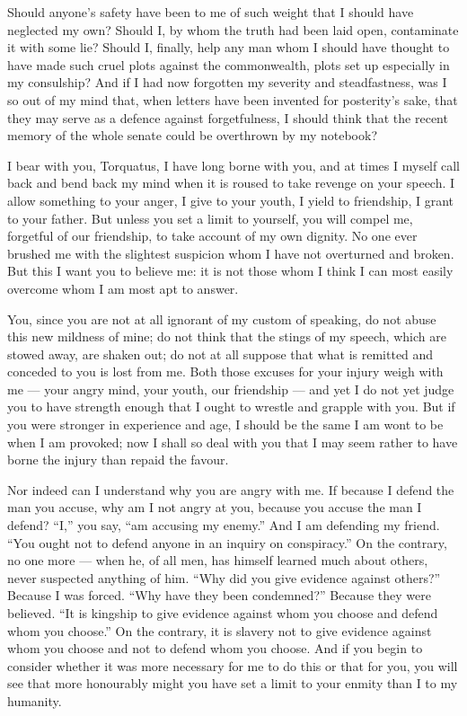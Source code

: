  Should anyone's safety have been to me of such weight that I should have neglected my own? Should I, by whom the truth had been laid open, contaminate it with some lie? Should I, finally, help any man whom I should have thought to have made such cruel plots against the commonwealth, plots set up especially in my consulship? And if I had now forgotten my severity and steadfastness, was I so out of my mind that, when letters have been invented for posterity's sake, that they may serve as a defence against forgetfulness, I should think that the recent memory of the whole senate could be overthrown by my notebook?

 I bear with you, Torquatus, I have long borne with you, and at times I myself call back and bend back my mind when it is roused to take revenge on your speech. I allow something to your anger, I give to your youth, I yield to friendship, I grant to your father. But unless you set a limit to yourself, you will compel me, forgetful of our friendship, to take account of my own dignity. No one ever brushed me with the slightest suspicion whom I have not overturned and broken. But this I want you to believe me: it is not those whom I think I can most easily overcome whom I am most apt to answer.

 You, since you are not at all ignorant of my custom of speaking, do not abuse this new mildness of mine; do not think that the stings of my speech, which are stowed away, are shaken out; do not at all suppose that what is remitted and conceded to you is lost from me. Both those excuses for your injury weigh with me --- your angry mind, your youth, our friendship --- and yet I do not yet judge you to have strength enough that I ought to wrestle and grapple with you. But if you were stronger in experience and age, I should be the same I am wont to be when I am provoked; now I shall so deal with you that I may seem rather to have borne the injury than repaid the favour.

 Nor indeed can I understand why you are angry with me. If because I defend the man you accuse, why am I not angry at you, because you accuse the man I defend? ``I,'' you say, ``am accusing my enemy.'' And I am defending my friend. ``You ought not to defend anyone in an inquiry on conspiracy.'' On the contrary, no one more --- when he, of all men, has himself learned much about others, never suspected anything of him. ``Why did you give evidence against others?'' Because I was forced. ``Why have they been condemned?'' Because they were believed. ``It is kingship to give evidence against whom you choose and defend whom you choose.'' On the contrary, it is slavery not to give evidence against whom you choose and not to defend whom you choose. And if you begin to consider whether it was more necessary for me to do this or that for you, you will see that more honourably might you have set a limit to your enmity than I to my humanity.


